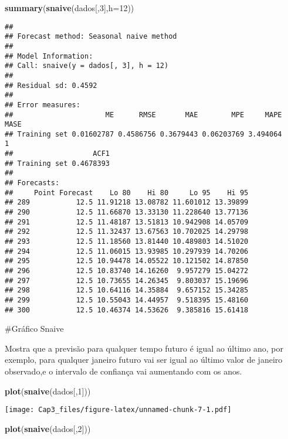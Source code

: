 \documentclass[]{article}
\newenvironment{Shaded}{\begin{snugshade}}{\end{snugshade}}
\newcommand{\DataTypeTok}[1]{\textcolor[rgb]{0.13,0.29,0.53}{#1}}
\newcommand{\DecValTok}[1]{\textcolor[rgb]{0.00,0.00,0.81}{#1}}
\newcommand{\KeywordTok}[1]{\textcolor[rgb]{0.13,0.29,0.53}{\textbf{#1}}}
\newcommand{\NormalTok}[1]{#1}
\begin{document}
\begin{Shaded}
\begin{Highlighting}[]
\KeywordTok{summary}\NormalTok{(}\KeywordTok{snaive}\NormalTok{(dados[,}\DecValTok{3}\NormalTok{],}\DataTypeTok{h=}\DecValTok{12}\NormalTok{))}
\end{Highlighting}
\end{Shaded}

\begin{verbatim}
## 
## Forecast method: Seasonal naive method
## 
## Model Information:
## Call: snaive(y = dados[, 3], h = 12) 
## 
## Residual sd: 0.4592 
## 
## Error measures:
##                      ME      RMSE       MAE        MPE     MAPE MASE
## Training set 0.01602787 0.4586756 0.3679443 0.06203769 3.494064    1
##                   ACF1
## Training set 0.4678393
## 
## Forecasts:
##     Point Forecast    Lo 80    Hi 80     Lo 95    Hi 95
## 289           12.5 11.91218 13.08782 11.601012 13.39899
## 290           12.5 11.66870 13.33130 11.228640 13.77136
## 291           12.5 11.48187 13.51813 10.942908 14.05709
## 292           12.5 11.32437 13.67563 10.702025 14.29798
## 293           12.5 11.18560 13.81440 10.489803 14.51020
## 294           12.5 11.06015 13.93985 10.297939 14.70206
## 295           12.5 10.94478 14.05522 10.121502 14.87850
## 296           12.5 10.83740 14.16260  9.957279 15.04272
## 297           12.5 10.73655 14.26345  9.803037 15.19696
## 298           12.5 10.64116 14.35884  9.657152 15.34285
## 299           12.5 10.55043 14.44957  9.518395 15.48160
## 300           12.5 10.46374 14.53626  9.385816 15.61418
\end{verbatim}

\#Gráfico Snaive

Mostra que a previsão para qualquer tempo futuro é igual ao último ano,
por exemplo, para qualquer janeiro futuro vai ser igual ao último valor
de janeiro observado,e o intervalo de confiança vai aumentando com os
anos.

\begin{Shaded}
\begin{Highlighting}[]
\KeywordTok{plot}\NormalTok{(}\KeywordTok{snaive}\NormalTok{(dados[,}\DecValTok{1}\NormalTok{]))}
\end{Highlighting}
\end{Shaded}

\texttt{[image: Cap3\_files/figure-latex/unnamed-chunk-7-1.pdf]}

\begin{Shaded}
\begin{Highlighting}[]
\KeywordTok{plot}\NormalTok{(}\KeywordTok{snaive}\NormalTok{(dados[,}\DecValTok{2}\NormalTok{]))}
\end{Highlighting}
\end{Shaded}
\end{document}
